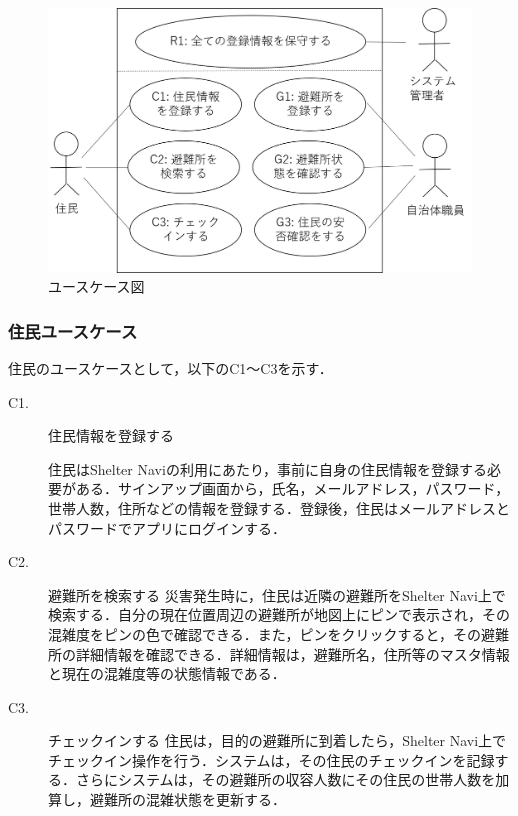 \documentclass[technicalreport,dvipdfmx]{ieicej}
\begin{document}
\begin{figure}[!t]
     \begin{center}
          \includegraphics[scale=0.35,pagebox=cropbox,clip]{img/usecase.png}
          \caption{ユースケース図}
          \label{fig:usecase}
     \end{center}
\end{figure}


\subsubsection{住民ユースケース}
住民のユースケースとして，以下のC1～C3を示す．
\begin{description}
     \item[C1.] 住民情報を登録する
     
     住民はShelter Naviの利用にあたり，事前に自身の住民情報を登録する必要がある．サインアップ画面から，氏名，メールアドレス，パスワード，世帯人数，住所などの情報を登録する．登録後，住民はメールアドレスとパスワードでアプリにログインする．

     \item[C2.] 避難所を検索する
     災害発生時に，住民は近隣の避難所をShelter Navi上で検索する．自分の現在位置周辺の避難所が地図上にピンで表示され，その混雑度をピンの色で確認できる．また，ピンをクリックすると，その避難所の詳細情報を確認できる．詳細情報は，避難所名，住所等のマスタ情報と現在の混雑度等の状態情報である．

     \item[C3.] チェックインする
     住民は，目的の避難所に到着したら，Shelter Navi上でチェックイン操作を行う．システムは，その住民のチェックインを記録する．さらにシステムは，その避難所の収容人数にその住民の世帯人数を加算し，避難所の混雑状態を更新する．
\end{description}
\end{document}
